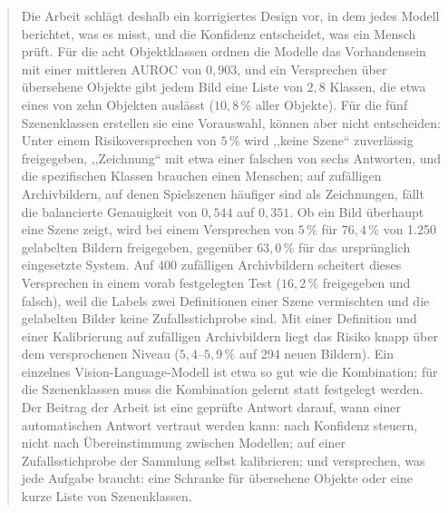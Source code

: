 {\begin{abstract}
Die Arbeit schlägt deshalb ein korrigiertes Design vor, in dem jedes Modell berichtet, was es misst, und die Konfidenz entscheidet, was ein Mensch prüft. Für die acht Objektklassen ordnen die Modelle das Vorhandensein mit einer mittleren AUROC von $0{,}903$, und ein Versprechen über übersehene Objekte gibt jedem Bild eine Liste von $2{,}8$ Klassen, die etwa eines von zehn Objekten auslässt ($10{,}8\,\%$ aller Objekte). Für die fünf Szenenklassen erstellen sie eine Vorauswahl, können aber nicht entscheiden: Unter einem Risikoversprechen von $5\,\%$ wird ,,keine Szene`` zuverlässig freigegeben, ,,Zeichnung`` mit etwa einer falschen von sechs Antworten, und die spezifischen Klassen brauchen einen Menschen; auf zufälligen Archivbildern, auf denen Spielszenen häufiger sind als Zeichnungen, fällt die balancierte Genauigkeit von $0{,}544$ auf $0{,}351$. Ob ein Bild überhaupt eine Szene zeigt, wird bei einem Versprechen von $5\,\%$ für $76{,}4\,\%$ von 1.250 gelabelten Bildern freigegeben, gegenüber $63{,}0\,\%$ für das ursprünglich eingesetzte System. Auf 400 zufälligen Archivbildern scheitert dieses Versprechen in einem vorab festgelegten Test ($16{,}2\,\%$ freigegeben und falsch), weil die Labels zwei Definitionen einer Szene vermischten und die gelabelten Bilder keine Zufallsstichprobe sind. Mit einer Definition und einer Kalibrierung auf zufälligen Archivbildern liegt das Risiko knapp über dem versprochenen Niveau ($5{,}4$--$5{,}9\,\%$ auf 294 neuen Bildern). Ein einzelnes Vision-Language-Modell ist etwa so gut wie die Kombination; für die Szenenklassen muss die Kombination gelernt statt festgelegt werden. Der Beitrag der Arbeit ist eine geprüfte Antwort darauf, wann einer automatischen Antwort vertraut werden kann: nach Konfidenz steuern, nicht nach Übereinstimmung zwischen Modellen; auf einer Zufallsstichprobe der Sammlung selbst kalibrieren; und versprechen, was jede Aufgabe braucht: eine Schranke für übersehene Objekte oder eine kurze Liste von Szenenklassen.
\end{abstract}}
